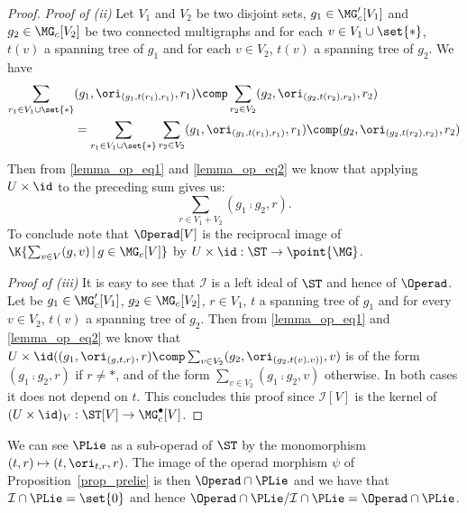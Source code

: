 \begin{proof}
    {\em Proof of (ii)} Let $V_1$ and $V_2$ be two disjoint sets, $g_1\in \MG'_c[V_1]$ and $g_2\in \MG_c[V_2]$
    be two connected multigraphs and for each $v\in V_1\cup\set{\ast}$, $t(v)$ a spanning tree of $g_1$ and for 
    each $v\in V_2$, $t(v)$ a spanning tree of $g_2$. We have
    \begin{align}
        \sum_{r_1\in V_1\cup\set{\ast}} &(g_1,\ori_{(g_1,t(r_1),r_1)}, r_1) \comp \sum_{r_2\in V_2} (g_2,\ori_{(g_2,t(r_2),r_2)}, r_2) \\ \nonumber
        &= \sum_{r_1\in V_1\cup\set{\ast}}\sum_{r_2\in V_2} (g_1,\ori_{(g_1,t(r_1),r_1)}, r_1)\comp (g_2,\ori_{(g_2,t(r_2),r_2)}, r_2) 
    \end{align}
    Then from \eqref{lemma_op_eq1} and \eqref{lemma_op_eq2} we know that applying $U\times\id$ to the 
    preceding sum gives us:
    \begin{equation}
        \sum_{r\in V_1+V_2} (g_1\comp g_2,r).
    \end{equation}
    To conclude note that $\Operad[V]$ is the reciprocal image of $\K\{\sum_{v\in V}(g,v)\,|\,g\in \MG_c[V]\}$
    by  $U\times\id: \ST\rightarrow \point{\MG}$.

    {\em Proof of (iii)} It is easy to see that $\mathcal{I}$ is a left ideal of $\ST$ and hence of $\Operad$.
    Let be $g_1\in \MG'_c[V_1]$, $g_2\in \MG_c[V_2]$, $r\in V_1$, $t$ a spanning tree of $g_1$ and for every 
    $v\in V_2$, $t(v)$ a spanning tree of $g_2$. Then from \eqref{lemma_op_eq1} and \eqref{lemma_op_eq2} we 
    know that $U\times\id((g_1,\ori_{(g,t,r)}, r)\comp \sum_{v\in V_2} (g_2,\ori_{(g_2,t(v),v))}, v)$ is of the form
    $(g_1\comp g_2, r)$ if $r\not = \ast$, and of the form $\sum_{v\in V_2} (g_1\comp g_2, v)$ otherwise. In 
    both cases it does not depend on $t$. This concludes this proof since $\mathcal{I}[V]$ is the kernel of 
    $(U\times\id)_V: \ST[V]\rightarrow \MG_c^{\bullet}[V]$.
\end{proof}

We can see $\PLie$ as a sub-operad of $\ST$ by the monomorphism $(t,r)\mapsto (t, \ori_{t,r},r)$. The image of the
operad morphism $\psi$ of Proposition~\ref{prop_prelie} is then $\Operad\cap \PLie$ and we have that 
$\mathcal{I}\cap \PLie = \set{0}$ and hence $\Operad\cap \PLie/\mathcal{I}\cap \PLie = \Operad\cap \PLie$.


